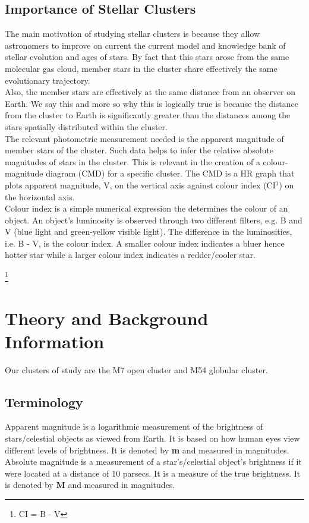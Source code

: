 \documentclass[12pt, twocolumn]{aastex62}
\begin{document}
\subsection{Importance of Stellar Clusters}
The main motivation of studying stellar clusters is because they allow astronomers to improve on current the current model and knowledge bank of stellar evolution and ages of stars. By fact that this stars arose from the same molecular gas cloud, member stars in the cluster share effectively the same evolutionary trajectory.\\
Also, the member stars are effectively at the same distance from an observer on Earth. We say this and more so why this is logically true is because the distance from the cluster to Earth is significantly greater than the distances among the stars spatially distributed within the cluster.\\
The relevant photometric measurement needed is the apparent magnitude of member stars of the cluster. Such data helps to infer the relative absolute magnitudes of stars in the cluster. This is relevant in the creation of a colour-magnitude diagram (CMD) for a specific cluster. The CMD is a HR graph that plots apparent magnitude, V, on the vertical axis against colour index (CI$^1$) on the horizontal axis.\\
Colour index is a simple numerical expression the determines the colour of an object. An object's luminosity is observed through two different filters, e.g. B and V (blue light and green-yellow visible light). The difference in the luminosities, i.e. B - V, is the colour index. A smaller colour index indicates a bluer hence hotter star while a larger colour index indicates a redder/cooler star.

\footnote{CI = B - V}



\pagebreak
\section{Theory and Background Information}
Our clusters of study are the M7 open cluster and M54 globular cluster.

\subsection{Terminology}
Apparent magnitude is a logarithmic measurement of the brightness of stars/celestial objects as viewed from Earth. It is based on how human eyes view different levels of brightness. It is denoted by \textbf{m} and measured in magnitudes.\\
Absolute magnitude is a measurement of a star's/celestial object's brightness if it were located at a distance of 10 parsecs. It is a measure of the true brightness. It is denoted by \textbf{M} and measured in magnitudes.
\end{document}
